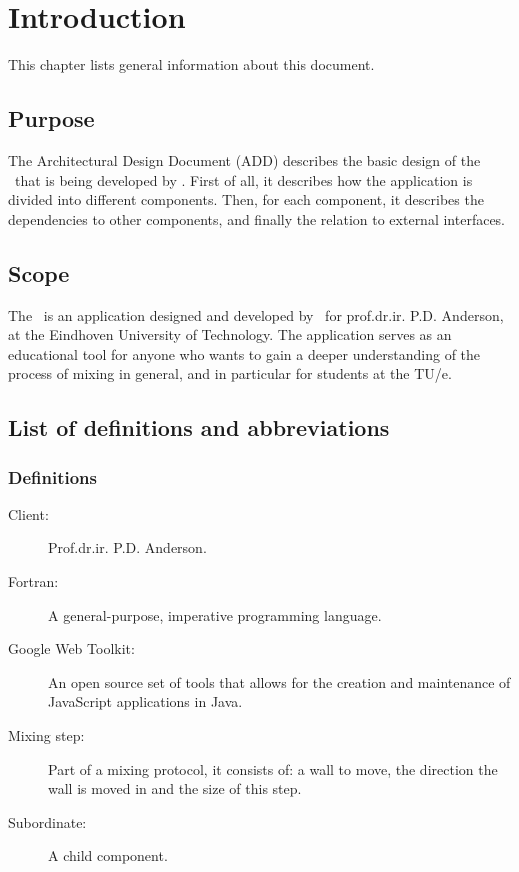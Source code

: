 \chapter{Introduction}

This chapter lists general information about this document.

\section{Purpose}
The Architectural Design Document (ADD) describes the basic design of the \applicationname\ that is being developed by \projectauthor. First of all, it describes how the application is divided into different components. Then, for each component, it describes the dependencies to other components, and finally the relation to external interfaces.

\section{Scope}
The \applicationname\ is an application designed and developed by \projectauthor\ for prof.dr.ir. P.D. Anderson, at the Eindhoven University of Technology. The application serves as an educational tool for anyone who wants to gain a deeper understanding of the process of mixing in general, and in particular for students at the TU/e.

\section{List of definitions and abbreviations}
\subsection{Definitions}
\begin{description}
\item[Client:] Prof.dr.ir. P.D. Anderson.
\item[Fortran:] A general-purpose, imperative programming language.
\item[Google Web Toolkit:] An open source set of tools that allows for the creation and maintenance of JavaScript applications in Java.
\item[Mixing step:] Part of a mixing protocol, it consists of: a wall to move, the direction the wall is moved in and the size of this step.
\item[Subordinate:] A child component.
\end{description}

